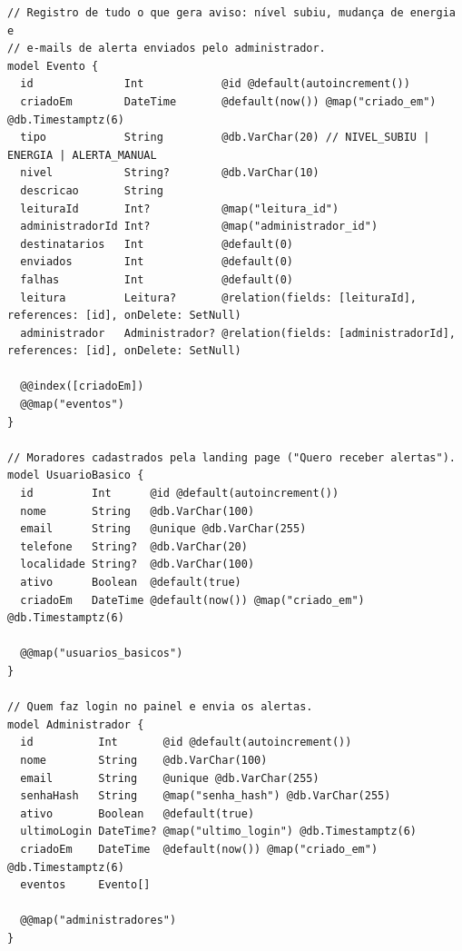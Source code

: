 \begin{lstlisting}[language=Prisma]
// Registro de tudo o que gera aviso: nível subiu, mudança de energia e
// e-mails de alerta enviados pelo administrador.
model Evento {
  id              Int            @id @default(autoincrement())
  criadoEm        DateTime       @default(now()) @map("criado_em") @db.Timestamptz(6)
  tipo            String         @db.VarChar(20) // NIVEL_SUBIU | ENERGIA | ALERTA_MANUAL
  nivel           String?        @db.VarChar(10)
  descricao       String
  leituraId       Int?           @map("leitura_id")
  administradorId Int?           @map("administrador_id")
  destinatarios   Int            @default(0)
  enviados        Int            @default(0)
  falhas          Int            @default(0)
  leitura         Leitura?       @relation(fields: [leituraId], references: [id], onDelete: SetNull)
  administrador   Administrador? @relation(fields: [administradorId], references: [id], onDelete: SetNull)

  @@index([criadoEm])
  @@map("eventos")
}

// Moradores cadastrados pela landing page ("Quero receber alertas").
model UsuarioBasico {
  id         Int      @id @default(autoincrement())
  nome       String   @db.VarChar(100)
  email      String   @unique @db.VarChar(255)
  telefone   String?  @db.VarChar(20)
  localidade String?  @db.VarChar(100)
  ativo      Boolean  @default(true)
  criadoEm   DateTime @default(now()) @map("criado_em") @db.Timestamptz(6)

  @@map("usuarios_basicos")
}

// Quem faz login no painel e envia os alertas.
model Administrador {
  id          Int       @id @default(autoincrement())
  nome        String    @db.VarChar(100)
  email       String    @unique @db.VarChar(255)
  senhaHash   String    @map("senha_hash") @db.VarChar(255)
  ativo       Boolean   @default(true)
  ultimoLogin DateTime? @map("ultimo_login") @db.Timestamptz(6)
  criadoEm    DateTime  @default(now()) @map("criado_em") @db.Timestamptz(6)
  eventos     Evento[]

  @@map("administradores")
}
\end{lstlisting}


